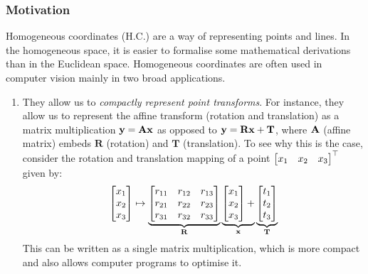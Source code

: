 \documentclass[a4paper]{article}
\begin{document}
\subsubsection{Motivation}
Homogeneous coordinates (H.C.) are a way of representing points and lines. In the homogeneous space, it is easier to formalise some mathematical derivations than in the Euclidean space. Homogeneous coordinates are often used in computer vision mainly in two broad applications.
\begin{enumerate}
    \item They allow us to \textit{compactly represent point transforms}. For instance, they allow us to represent the affine transform (rotation and translation) as a matrix multiplication $\textbf{y} = \textbf{A}\textbf{x}$ as opposed to $\textbf{y} = \textbf{R}\textbf{x} + \textbf{T}$, where $\textbf{A}$ (affine matrix) embeds $\textbf{R}$ (rotation) and $\textbf{T}$ (translation). To see why this is the case, consider the rotation and translation mapping of a point $\begin{bmatrix}x_1 & x_2 & x_3\end{bmatrix}^{\top}$ given by:
    \[
        \begin{bmatrix} x_1 \\ x_2 \\ x_3 \end{bmatrix} \mapsto
        \underbrace{
            \begin{bmatrix}
            r_{11} & r_{12} & r_{13} \\
            r_{21} & r_{22} & r_{23} \\
            r_{31} & r_{32} & r_{33} \\
            \end{bmatrix}
        }
        _{\textbf{R}}
        \underbrace{\begin{bmatrix} x_1 \\ x_2 \\ x_3 \end{bmatrix} +}_{\textbf{x}}
        \underbrace{\begin{bmatrix} t_1 \\ t_2 \\ t_3 \end{bmatrix}}_{\textbf{T}}
    \]
    This can be written as a single matrix multiplication, which is more compact and also allows computer programs to optimise it.
    

\end{enumerate}
\end{document}
